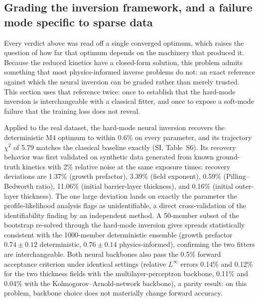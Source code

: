 \documentclass[a4paper,fleqn]{cas-sc}
\begin{document}
\subsection{Grading the inversion framework, and a failure mode specific
to sparse data}\label{sec:pinn}

Every verdict above was read off a single converged optimum, which
raises the question of how far that optimum depends on the machinery
that produced it. Because the reduced kinetics have a closed-form
solution, this problem
admits something that most physics-informed inverse problems do not: an
exact reference against which the neural inversion can be graded rather
than merely trusted. This section uses that reference twice: once to
establish that the hard-mode inversion is interchangeable with a
classical fitter, and once to expose a soft-mode failure that the
training loss does not reveal.

Applied to the real dataset, the hard-mode neural inversion recovers the
deterministic M4 optimum to within 0.6\% on every parameter, and its
trajectory $\chi^2$ of 5.79 matches the classical baseline exactly
(SI, Table~S6). Its recovery behavior was first validated on
synthetic data generated from known ground-truth kinetics with 2\%
relative noise at the same exposure times: recovery deviations are
1.37\% (growth prefactor), 3.39\% (field exponent), 0.59\%
(Pilling--Bedworth ratio), 11.06\% (initial barrier-layer thickness),
and 0.16\% (initial outer-layer thickness). The one large deviation
lands on exactly the parameter the profile-likelihood analysis flags as
unidentifiable, a direct cross-validation of the identifiability
finding by an independent method. A 50-member subset of the bootstrap
re-solved through the hard-mode inversion gives spreads statistically
consistent with the 1000-member deterministic ensemble (growth
prefactor $0.74 \pm 0.12$ deterministic, $0.76 \pm 0.14$
physics-informed), confirming the two fitters are interchangeable. Both neural backbones
also pass the 0.5\% forward acceptance criterion under identical
settings (relative $L^\infty$ errors 0.14\% and 0.12\% for the two
thickness fields with the multilayer-perceptron backbone, 0.11\% and
0.04\% with the Kolmogorov--Arnold-network backbone), a parity result:
on this problem, backbone choice does not materially change forward
accuracy.
\end{document}
